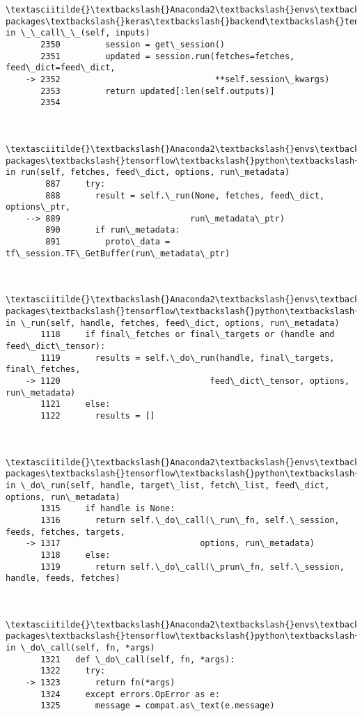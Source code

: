\documentclass[11pt]{article}
\begin{document}
\begin{Verbatim}[commandchars=\\\{\}]
        \textasciitilde{}\textbackslash{}Anaconda2\textbackslash{}envs\textbackslash{}tensorflow\textbackslash{}lib\textbackslash{}site-packages\textbackslash{}keras\textbackslash{}backend\textbackslash{}tensorflow\_backend.py in \_\_call\_\_(self, inputs)
       2350         session = get\_session()
       2351         updated = session.run(fetches=fetches, feed\_dict=feed\_dict,
    -> 2352                               **self.session\_kwargs)
       2353         return updated[:len(self.outputs)]
       2354 
    

        \textasciitilde{}\textbackslash{}Anaconda2\textbackslash{}envs\textbackslash{}tensorflow\textbackslash{}lib\textbackslash{}site-packages\textbackslash{}tensorflow\textbackslash{}python\textbackslash{}client\textbackslash{}session.py in run(self, fetches, feed\_dict, options, run\_metadata)
        887     try:
        888       result = self.\_run(None, fetches, feed\_dict, options\_ptr,
    --> 889                          run\_metadata\_ptr)
        890       if run\_metadata:
        891         proto\_data = tf\_session.TF\_GetBuffer(run\_metadata\_ptr)
    

        \textasciitilde{}\textbackslash{}Anaconda2\textbackslash{}envs\textbackslash{}tensorflow\textbackslash{}lib\textbackslash{}site-packages\textbackslash{}tensorflow\textbackslash{}python\textbackslash{}client\textbackslash{}session.py in \_run(self, handle, fetches, feed\_dict, options, run\_metadata)
       1118     if final\_fetches or final\_targets or (handle and feed\_dict\_tensor):
       1119       results = self.\_do\_run(handle, final\_targets, final\_fetches,
    -> 1120                              feed\_dict\_tensor, options, run\_metadata)
       1121     else:
       1122       results = []
    

        \textasciitilde{}\textbackslash{}Anaconda2\textbackslash{}envs\textbackslash{}tensorflow\textbackslash{}lib\textbackslash{}site-packages\textbackslash{}tensorflow\textbackslash{}python\textbackslash{}client\textbackslash{}session.py in \_do\_run(self, handle, target\_list, fetch\_list, feed\_dict, options, run\_metadata)
       1315     if handle is None:
       1316       return self.\_do\_call(\_run\_fn, self.\_session, feeds, fetches, targets,
    -> 1317                            options, run\_metadata)
       1318     else:
       1319       return self.\_do\_call(\_prun\_fn, self.\_session, handle, feeds, fetches)
    

        \textasciitilde{}\textbackslash{}Anaconda2\textbackslash{}envs\textbackslash{}tensorflow\textbackslash{}lib\textbackslash{}site-packages\textbackslash{}tensorflow\textbackslash{}python\textbackslash{}client\textbackslash{}session.py in \_do\_call(self, fn, *args)
       1321   def \_do\_call(self, fn, *args):
       1322     try:
    -> 1323       return fn(*args)
       1324     except errors.OpError as e:
       1325       message = compat.as\_text(e.message)
    


\end{Verbatim}
\end{document}
